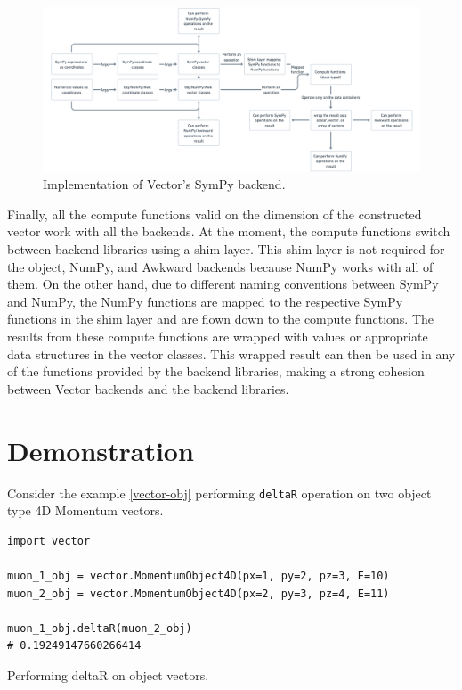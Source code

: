 \documentclass{webofc}
\begin{document}
\begin{figure}[h]
     \centering
     \includegraphics[width=\textwidth]{sympy-backend.png}
     \caption{Implementation of Vector's SymPy backend.}
        \label{fig:sympy}
\end{figure}

Finally, all the compute functions valid on the dimension of the constructed vector work with all the backends. At the moment, the compute functions switch between backend libraries using a shim layer. This shim layer is not required for the object, NumPy, and Awkward backends because NumPy works with all of them. On the other hand, due to different naming conventions between SymPy and NumPy, the NumPy functions are mapped to the respective SymPy functions in the shim layer and are flown down to the compute functions. The results from these compute functions are wrapped with values or appropriate data structures in the vector classes. This wrapped result can then be used in any of the functions provided by the backend libraries, making a strong cohesion between Vector backends and the backend libraries.

\section{Demonstration}
\label{sec-demonstration}

Consider the example \ref{vector-obj} performing \texttt{deltaR} operation on two object type 4D Momentum vectors.

\begin{listing}[!ht]
\begin{verbatim}
import vector

muon_1_obj = vector.MomentumObject4D(px=1, py=2, pz=3, E=10)
muon_2_obj = vector.MomentumObject4D(px=2, py=3, pz=4, E=11)

muon_1_obj.deltaR(muon_2_obj)
# 0.19249147660266414
\end{verbatim}
\caption{Performing deltaR on object vectors.}
\label{vector-obj}
\end{listing}
\end{document}
